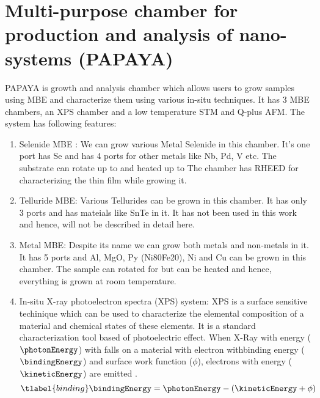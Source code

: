 
\section{Multi-purpose chamber for production and analysis of nano-systems (PAPAYA)}
\label{papaya}


PAPAYA is growth and analysis chamber which allows users to grow samples using
MBE and characterize them using various in-situ techniques. It has 3 MBE 
chambers, an XPS chamber and a low temperature STM and Q-plus AFM. The system 
has following features:

\begin{enumerate}
    \item Selenide MBE : We can grow various Metal Selenide in this chamber. 
    It's one port has Se and has 4 ports for other metals like Nb, Pd, V etc. 
    The substrate can rotate up to  and heated up to 
     The chamber has RHEED for characterizing the thin 
    film while growing it.

    \item Telluride MBE: Various Tellurides can be grown in this chamber. 
    It has only 3 ports and has mateials like SnTe in it. It has not been 
    used in this work and hence, will not be described in detail here.

    \item Metal MBE: Despite its name we can grow both metals and non-metals 
    in it. It has 5 ports and Al, MgO, Py (Ni80Fe20), Ni and Cu  can be grown 
    in this chamber. The sample can rotated for  but can 
    be heated and hence, everything is grown at room temperature.

    \item In-situ X-ray photoelectron spectra (XPS) system: XPS is a surface 
    sensitive techinique which can be used to characterize the elemental 
    composition of a material and chemical states of these elements. It is 
    a standard characterization tool based of photoelectric effect. When 
    X-Ray with energy ($\photonEnergy$) with falls on a material with electron 
    withbinding energy ($\bindingEnergy$) and surface work function ($\phi$), 
    electrons with energy ($\kineticEnergy$) are emitted \cite{Powell2010}.
    \begin{equation}
        \tlabel{binding}
        \bindingEnergy = \photonEnergy - \left( \kineticEnergy + \phi \right) 
    \end{equation}


\end{enumerate}
